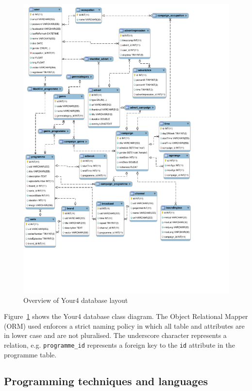 \begin{figure}[H]
	\centering
	\includegraphics[trim = 0 3.7cm 3.5cm 0, clip, width=\textwidth]{images/your4-db.pdf}
	\caption{Overview of Your4 database layout}
	\label{fig:your4-db}
\end{figure}

Figure~\ref{fig:your4-db} shows the Your4 database class diagram. The Object Relational Mapper (ORM) used enforces a strict naming policy in which all table and attributes are in lower case and are not pluralised. The underscore character represents a relation, e.g. \texttt{programme\_id} represents a foreign key to the \texttt{id} attribute in the programme table.

\subsection{Programming techniques and languages}

